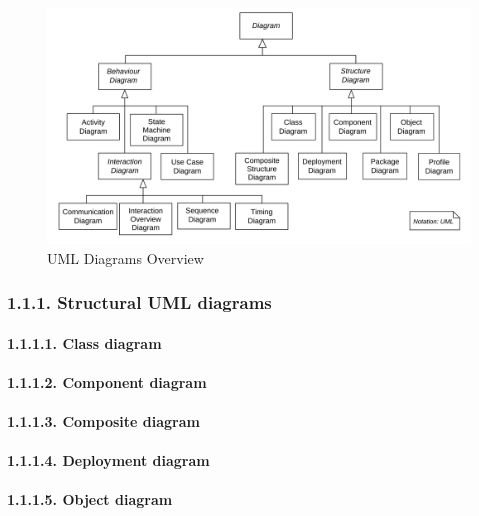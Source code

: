 \documentclass[
]{article}
\begin{document}
\begin{figure}
\centering
\includegraphics{../requirements/uml_diagrams_overview.svg}
\caption{UML Diagrams Overview}
\end{figure}

\hypertarget{structural-uml-diagrams}{%
\subsubsection{1.1.1. Structural UML
diagrams}\label{structural-uml-diagrams}}

\hypertarget{class-diagram}{%
\paragraph{1.1.1.1. Class diagram}\label{class-diagram}}

\hypertarget{component-diagram}{%
\paragraph{1.1.1.2. Component diagram}\label{component-diagram}}

\hypertarget{composite-diagram}{%
\paragraph{1.1.1.3. Composite diagram}\label{composite-diagram}}

\hypertarget{deployment-diagram}{%
\paragraph{1.1.1.4. Deployment diagram}\label{deployment-diagram}}

\hypertarget{object-diagram}{%
\paragraph{1.1.1.5. Object diagram}\label{object-diagram}}
\end{document}
